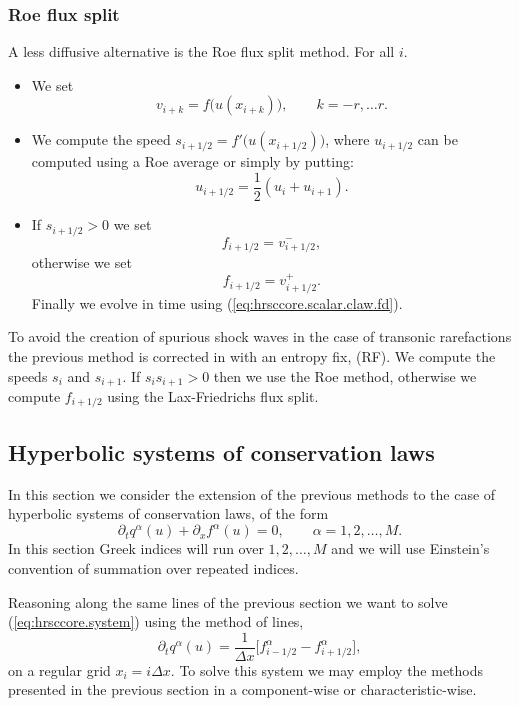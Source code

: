\subsubsection{Roe flux split}
A less diffusive alternative is the Roe flux split method. For all $i$.
\begin{itemize}
  \item We set
  \[
    v_{i+k} = f\big(u(x_{i+k})\big), \qquad k = -r, \ldots r.
  \]
  \item We compute the speed $s_{i+1/2} = f'\big(u(x_{i+1/2})\big)$,
  where $u_{i+1/2}$ can be computed using a Roe average or simply by putting:
  \[
    u_{i+1/2} = \frac{1}{2} ( u_i + u_{i+1} ).
  \]
  \item If $s_{i+1/2} > 0$ we set
  \[
    f_{i+1/2} = v_{i+1/2}^-,
  \]
  otherwise we set
  \[
    f_{i+1/2} = v_{i+1/2}^+.
  \]
  Finally we evolve in time using (\ref{eq:hrsccore.scalar.claw.fd}).
\end{itemize}
To avoid the creation of spurious shock waves in the case of transonic
rarefactions the previous method is corrected in with an entropy fix, (RF).
We compute the speeds $s_{i}$ and $s_{i+1}$. If $s_{i} s_{i+1} > 0$ then we use
the Roe method, otherwise we compute $f_{i+1/2}$ using the Lax-Friedrichs flux
split.

\subsection{Hyperbolic systems of conservation laws}
In this section we consider the extension of the previous methods to the case of
hyperbolic systems of conservation laws, of the form
\begin{equation}\label{eq:hrsccore.system}
  \partial_t q^\alpha(u) + \partial_x f^\alpha(u) = 0, \qquad \alpha =
  1,2,\ldots, M.
\end{equation}
In this section Greek indices will run over $1,2,\ldots, M$ and we will use
Einstein's convention of summation over repeated indices.

Reasoning along the same lines of the previous section we want to solve
(\ref{eq:hrsccore.system}) using the method of lines,
\begin{equation}\label{eq:hrsccore.system.fd}
  \partial_t q^\alpha(u) = \frac{1}{\Delta x} \big[ f_{i-1/2}^\alpha -
  f_{i+1/2}^\alpha \big],
\end{equation}
on a regular grid $x_i = i \Delta x$. To solve this system we may employ the
methods presented in the previous section in a component-wise or
characteristic-wise.


